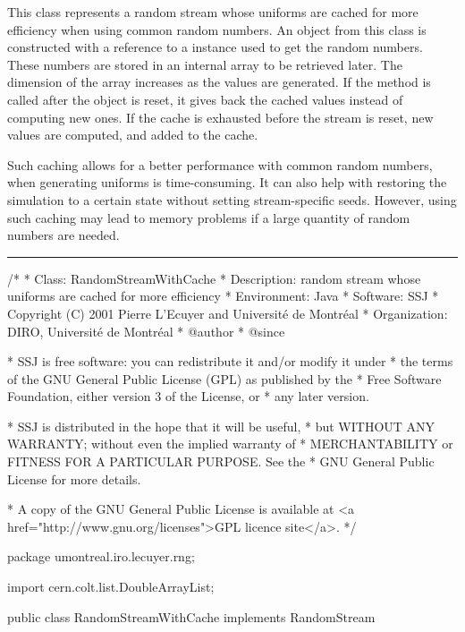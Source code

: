 
This class represents a random stream whose uniforms
are cached for more efficiency when using
common random numbers.  An object
from this class is constructed with a reference to a
 instance used to
get the random numbers.  These numbers
are stored in an internal array to be retrieved later.
The dimension of the array increases as the values
are generated.
If the  method is called after
the object is reset, it gives back the cached
values instead of computing new ones.
If the cache is exhausted before the stream is reset,
new values are computed, and added to the cache.

Such caching allows for a better performance with
common random numbers, when
generating uniforms is time-consuming.
It can also help with restoring the simulation to a
certain state without setting stream-specific
seeds.
However, using such caching may lead to memory problems if
a large quantity of random numbers are needed.

\bigskip\hrule

\begin{code}
\begin{hide}
/*
 * Class:        RandomStreamWithCache
 * Description:  random stream whose uniforms are cached for more efficiency
 * Environment:  Java
 * Software:     SSJ 
 * Copyright (C) 2001  Pierre L'Ecuyer and Université de Montréal
 * Organization: DIRO, Université de Montréal
 * @author       
 * @since

 * SSJ is free software: you can redistribute it and/or modify it under
 * the terms of the GNU General Public License (GPL) as published by the
 * Free Software Foundation, either version 3 of the License, or
 * any later version.

 * SSJ is distributed in the hope that it will be useful,
 * but WITHOUT ANY WARRANTY; without even the implied warranty of
 * MERCHANTABILITY or FITNESS FOR A PARTICULAR PURPOSE.  See the
 * GNU General Public License for more details.

 * A copy of the GNU General Public License is available at
   <a href="http://www.gnu.org/licenses">GPL licence site</a>.
 */
\end{hide}
package umontreal.iro.lecuyer.rng;\begin{hide}

import cern.colt.list.DoubleArrayList;
\end{hide}

public class RandomStreamWithCache implements RandomStream\begin{hide} {
   private RandomStream stream;
   private DoubleArrayList values;
   private int index = 0;
   private boolean caching = true;
\end{hide}
\end{code}

